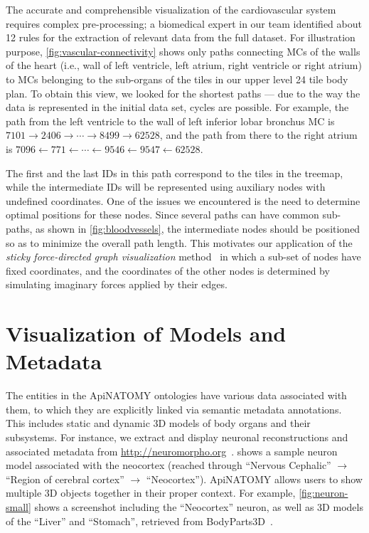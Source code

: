 The accurate and comprehensible visualization of the cardiovascular system requires complex pre-processing; a biomedical expert in our team identified about 12 rules for the extraction of relevant data from the full dataset.
For illustration purpose, \cref{fig:vascular-connectivity} shows only paths connecting MCs of the walls of the heart (i.e., wall of left ventricle, left atrium, right ventricle or right atrium) to MCs belonging to the sub-organs of the tiles in our upper level 24 tile body plan. To obtain this view, we looked for the shortest paths --- due to the way the data is represented in the initial data set, cycles are possible. For example, the path from the left ventricle to the wall of left inferior lobar bronchus MC is
{$7101 \rightarrow 2406 \rightarrow \cdots \rightarrow 8499 \rightarrow 62528$,}
and the path from there to the right atrium is
{$7096 \leftarrow 771 \leftarrow \cdots \leftarrow 9546 \leftarrow 9547 \leftarrow 62528$.}

The first and the last IDs in this path correspond to the tiles in the treemap, while the intermediate IDs will be represented using auxiliary nodes with undefined coordinates. One of the issues we encountered is the need to determine optimal positions for these nodes. Since several paths can have common sub-paths, as shown in \cref{fig:bloodvessels}, the intermediate nodes should be positioned so as to minimize the overall path length. This motivates our application of the \emph{sticky force-directed graph visualization} method~\cite{FR91,Bos14} in which a sub-set of nodes have fixed coordinates, and the coordinates of the other nodes is determined by simulating imaginary forces applied by their edges.


\clearpage %

\section{Visualization of Models and Metadata} \label{sect:visualization2}               %

The entities in the ApiNATOMY ontologies have various data associated with them, to which they are explicitly linked via semantic metadata annotations. This includes static and dynamic 3D models of body organs and their subsystems.
For instance, we extract and display neuronal reconstructions and associated metadata from \url{http://neuromorpho.org}~\cite{Asc06}.
 shows a sample neuron model associated with the neocortex (reached through ``Nervous Cephalic'' $\rightarrow$ ``Region of cerebral cortex'' $\rightarrow$ ``Neocortex''). ApiNATOMY allows users to show multiple 3D objects together in their proper context. For example, \cref{fig:neuron-small} shows a screenshot including the ``Neocortex'' neuron, as well as 3D models of the ``Liver'' and ``Stomach'', retrieved from BodyParts3D~\cite{MFT+09}.

